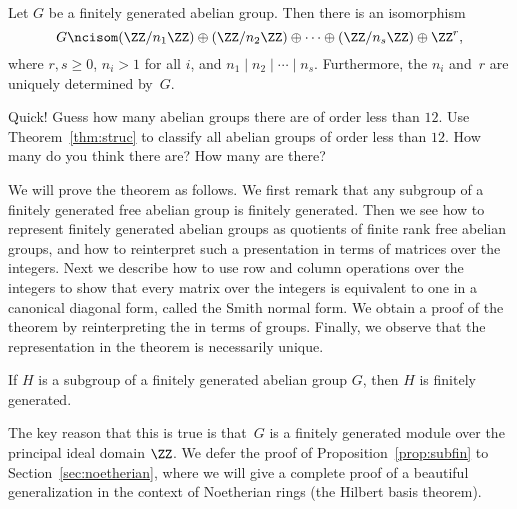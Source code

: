 \begin{theorem}
  \label{thm:struc}
  Let $G$ be a finitely generated abelian group. Then there is an isomorphism
  $$
    G \ncisom (\ZZ/n_1\ZZ) \oplus (\ZZ/n_2\ZZ) \oplus
    \cdots \oplus (\ZZ/n_s\ZZ) \oplus \ZZ^{r},
  $$
  where $r, s\geq 0$, $n_i>1$ for all $i$, and
  $n_1 \mid n_2 \mid \cdots \mid n_s$.
  Furthermore, the $n_i$ and~$r$ are uniquely determined by~$G$.
\end{theorem}

\begin{exercise}
  Quick! Guess how many abelian groups there are of order less than $12$.
  Use Theorem~\ref{thm:struc} to classify all abelian groups of order
  less than $12$. How many do you think there are? How many are there?
\end{exercise}

We will prove the theorem as follows.  We first remark that any
subgroup of a finitely generated free abelian group is finitely
generated.  Then we see how to represent finitely generated abelian groups
as quotients of finite rank free abelian groups, and how to
reinterpret such a presentation in terms of matrices over the
integers.  Next we describe how to use row and column operations over
the integers to show that every matrix over the integers is equivalent
to one in a canonical diagonal form, called the Smith normal form.  We
obtain a proof of the theorem by reinterpreting the  in terms of groups.  Finally, we observe that
the representation in the theorem is necessarily unique.

\begin{proposition}\label{prop:subfin}
  If $H$ is a subgroup of a finitely generated abelian group $G$,
  then $H$ is finitely generated.
\end{proposition}
The key reason that this is true is that~$G$ is a finitely generated
module over the principal ideal domain $\ZZ$.  We defer the
proof of Proposition~\ref{prop:subfin} to Section~\ref{sec:noetherian},
where we will give a complete proof of a beautiful generalization
in the context of Noetherian rings (the Hilbert basis theorem).

